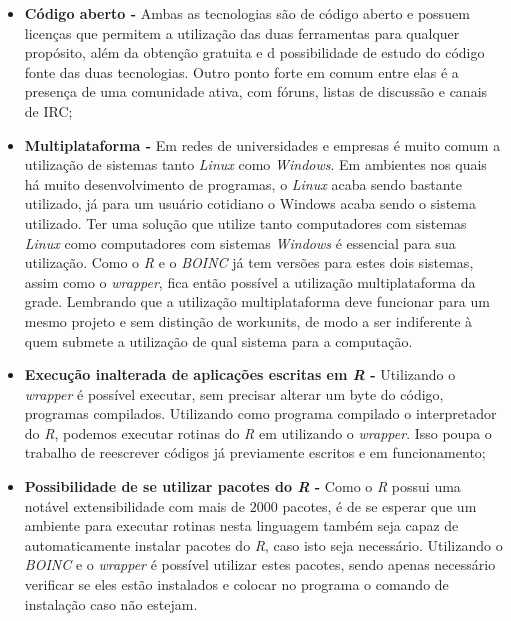 \begin{itemize}
  \item \textbf{Código aberto -} Ambas as tecnologias são de código aberto e possuem licenças que permitem a utilização das duas
ferramentas para qualquer propósito, além da obtenção gratuita e d possibilidade de estudo do código fonte das duas tecnologias.
Outro ponto forte em comum entre elas é a presença de uma comunidade ativa, com fóruns, listas de discussão e canais de IRC;
  \item \textbf{Multiplataforma -}  Em redes de universidades e empresas é muito comum a utilização de sistemas tanto 
\emph{Linux} como \emph{Windows}. Em ambientes nos quais há muito desenvolvimento de programas, o \emph{Linux} acaba
sendo bastante utilizado, já para um usuário cotidiano o Windows acaba sendo o sistema utilizado. Ter uma solução
que utilize tanto computadores com sistemas \emph{Linux} como computadores com sistemas \emph{Windows} é essencial 
para sua utilização. Como o \emph{R} e o \emph{BOINC} já tem versões para estes dois sistemas, assim como o \emph{wrapper}, 
fica então possível a utilização multiplataforma da grade. Lembrando que a utilização multiplataforma deve funcionar para um mesmo
projeto e sem distinção de workunits, de modo a ser indiferente à quem submete a utilização de qual sistema para a computação.
  \item \textbf{Execução inalterada de aplicações escritas em \emph{R} -} Utilizando o \emph{wrapper} é possível executar,
sem precisar alterar um byte do código, programas compilados. Utilizando como programa compilado o interpretador do 
\emph{R}, podemos executar rotinas do \emph{R} em utilizando o \emph{wrapper}. Isso poupa o trabalho de reescrever
códigos já previamente escritos e em funcionamento;
  \item \textbf{Possibilidade de se utilizar pacotes do \emph{R} -} Como o \emph{R} possui uma notável extensibilidade com mais
de $2000$ pacotes, é de se esperar que um ambiente para executar rotinas nesta linguagem também seja capaz de automaticamente instalar
pacotes do \emph{R}, caso isto seja necessário. Utilizando o \emph{BOINC} e o \emph{wrapper} é possível utilizar estes pacotes,
sendo apenas necessário verificar se eles estão instalados e colocar no programa o comando de instalação caso não estejam.
\end{itemize}

